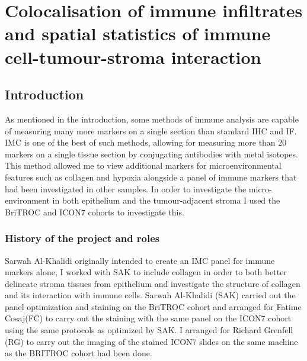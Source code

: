
\chapter{Colocalisation of immune infiltrates and spatial statistics of immune cell-tumour-stroma interaction}

\ifpdf
    \graphicspath{{Chapter4/Figs/Raster/}{Chapter4/Figs/PDF/}{Chapter4/Figs/}}
\else
    \graphicspath{{Chapter4/Figs/Vector/}{Chapter4/Figs/}}
\fi


\section[Introduction]{Introduction}

As mentioned in the introduction, some methods of immune analysis are capable of measuring many more markers on a single section than standard IHC and IF. IMC is one of the best of such methods, allowing for measuring more than 20 markers on a single tissue section by conjugating antibodies with metal isotopes. This method allowed me to view additional markers for microenvironmental features such as collagen and hypoxia alongside a panel of immune markers that had been investigated in other samples. In order to investigate the micro-environment in both epithelium and the tumour-adjacent stroma I used the BriTROC and ICON7 cohorts to investigate this.

\subsection{History of the project and roles}
Sarwah Al-Khalidi originally intended to create an IMC panel for immune markers alone, I worked with SAK to include collagen in order to both better delineate stroma tissues from epithelium and investigate the structure of collagen and its interaction with immune cells. Sarwah Al-Khalidi (SAK) carried out the panel optimization and staining on the BriTROC cohort and arranged for Fatime Cosaj(FC) to carry out the staining with the same panel on the ICON7 cohort using the same protocols as optimized by SAK. I arranged for Richard Grenfell (RG) to carry out the imaging of the stained ICON7 slides on the same machine as the BRITROC cohort had been done.


